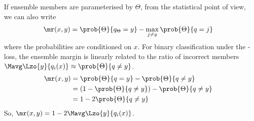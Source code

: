 \documentclass[
    a4paper, %
	fontsize=10pt, %
	twoside=false, %
]{kaobook}
\begin{document}
If ensemble members are parameterised by $\Theta$, from the statistical point of view, we can also write
$$
\mr(x,y) = \prob{\Theta}{q_{\Theta} = y} - \max_{j \not=y} \prob{\Theta}{q=j}
$$
where the probabilities are conditioned on $x$. For binary classification under the \zeroone-loss, the ensemble margin is linearly related to the ratio of incorrect members $\Mavg \Lzo{y}{q_{i}(x)} \approx \prob{\Theta}{q \not= y}$.
$$
\begin{align*}
\mr(x,y) &= \prob{\Theta}{q=y}  - \prob{\Theta}{q \not= y} \\
&= (1 - \prob{\Theta}{q \not= y}) - \prob{\Theta}{q \not= y} \\
&= 1 - 2 \prob{\Theta}{q \not= y}
\end{align*}
$$
So, $\mr(x,y) = 1 - 2 \Mavg\Lzo{y}{q_{i}(x)}$.



\end{document}
